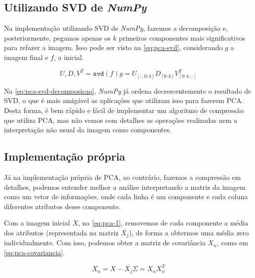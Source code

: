 \documentclass[brazilian,a4paper,twocolumn]{article}
\begin{document}
    \subsection{Utilizando SVD de \emph{NumPy}}

        Na implementação utilizando SVD de \emph{NumPy}, fazemos a decomposição e, posteriormente, pegamos apenas os $k$ primeiros componentes mais significativos para refazer a imagem. Isso pode ser visto na \cref{eq:pca-svd}, considerando $g$ a imagem final e $f$, a inicial.

        \begin{subequations}
            \label{eq:pca-svd}
            \begin{equation}
                \label{eq:pca-svd-decomposicao}
                U, D, V^T = \texttt{svd}(f)
            \end{equation}
            \begin{equation}
                \label{eq:pca-svd-recombinacao}
                g = U_{[:, 0:k]} D_{[0:k]} V^T_{[0:k, :]}
            \end{equation}
        \end{subequations}

        Na \cref{eq:pca-svd-decomposicao}, \emph{NumPy} já ordena decrescentemente o resultado de SVD, o que é mais amigável as aplicações que utilizam isso para fazerem PCA. Desta forma, é bem rápido e fácil de implementar um algoritmo de compressão que utiliza PCA, mas não vemos com detalhes as operações realizadas nem a interpretação não usual da imagem como componentes.

    \subsection{Implementação própria}

        Já na implementação própria de PCA, ao contrário, fazemos a compressão em detalhes, podemos entender melhor a análise interpretando a matriz da imagem como um vetor de informações, onde cada linha é um componente e cada coluna diferentes atributos desse componente.

        Com a imagem inicial $X$, na \cref{eq:pca-1}, removemos de cada componente a média dos atributos (representada na matriz $\overline{X_j}$), de forma a obtermos uma média zero individualmente. Com isso, podemos obter a matriz de covariância $X_n$, como em \cref{eq:pca-covariancia}.

        \begin{subequations}
            \label{eq:pca-1}
            \begin{equation}
                \label{eq:pca-media}
                X_n = X - \overline{X_j}
            \end{equation}
            \begin{equation}
                \label{eq:pca-covariancia}
                \Sigma = X_n X_n^T
            \end{equation}
        \end{subequations}
\end{document}
